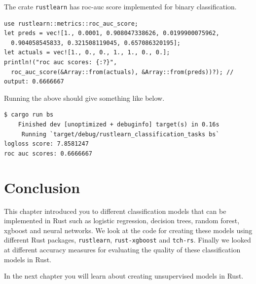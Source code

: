 \documentclass{book}
\begin{document}
The crate \lstinline{rustlearn} has roc-auc score implemented for binary classification.

\begin{lstlisting}[caption={chaper3\\/rustlearn\_classification\_tasks\\/src\\/binary\_class\_scores\\.rs}]
use rustlearn::metrics::roc_auc_score;
let preds = vec![1., 0.0001, 0.908047338626, 0.0199900075962,
  0.904058545833, 0.321508119045, 0.657086320195];
let actuals = vec![1., 0., 0., 1., 1., 0., 0.];
println!("roc auc scores: {:?}",
  roc_auc_score(&Array::from(actuals), &Array::from(preds))?); // output: 0.6666667 
\end{lstlisting}

Running the above should give something like below.

\begin{lstlisting}[caption={chaper3\\/rustlearn\_classification\_tasks\\/src\\/binary\_class\_scores\\.rs}]
$ cargo run bs
    Finished dev [unoptimized + debuginfo] target(s) in 0.16s
     Running `target/debug/rustlearn_classification_tasks bs`
logloss score: 7.8581247
roc auc scores: 0.6666667
\end{lstlisting}
\label{par:roc_auc}

%
%
%

\label{sec:classification}

\section{Conclusion}%
This chapter introduced you to different classification models that can be implemented in Rust such as logistic regression, decision trees, random forest, xgboost and neural networks. We look at the code for creating these models using different Rust packages, \lstinline{rustlearn}, \lstinline{rust-xgboost} and \lstinline{tch-rs}. Finally we looked at different accuracy measures for evaluating the quality of these classification models in Rust.

In the next chapter you will learn about creating unsupervised models in Rust.

\label{sec:conclusion}

\printbibliography
\nocite{*}
\end{document}
